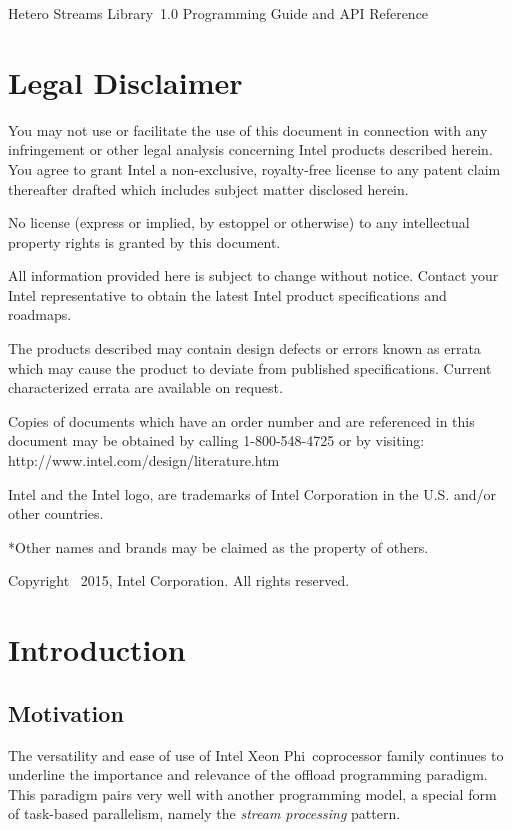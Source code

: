 \documentclass[a4,oneside]{book}
\newcommand{\ixp}{Intel\textregistered{} Xeon Phi\texttrademark{}}
\newcommand{\heterostreams}{Hetero Streams Library}
\begin{document}
\hypersetup{pageanchor=false}
\begin{titlepage}
\vspace*{7cm}
\begin{center}
    {\Large \heterostreams\ 1.0 Programming Guide and API Reference}\\[2em]
\end{center}
\end{titlepage}
\clearemptydoublepage
\chapter*{Legal Disclaimer}
You may not use or facilitate the use of this document in connection with any infringement or other legal analysis concerning Intel products described herein. You agree to grant Intel a non-exclusive, royalty-free license to any patent claim thereafter drafted which includes subject matter disclosed herein.

No license (express or implied, by estoppel or otherwise) to any intellectual property rights is granted by this document.

All information provided here is subject to change without notice. Contact your Intel representative to obtain the latest Intel product specifications and roadmaps.

The products described may contain design defects or errors known as errata which may cause the product to deviate from published specifications. Current characterized errata are available on request.

Copies of documents which have an order number and are referenced in this document may be obtained by calling 1-800-548-4725 or by visiting: http://www.intel.com/design/literature.htm

Intel and the Intel logo, are trademarks of Intel Corporation in the U.S. and/or other countries.

*Other names and brands may be claimed as the property of others.

Copyright \textcopyright\ 2015, Intel Corporation. All rights reserved.
\clearemptydoublepage

\tableofcontents
\clearemptydoublepage
{}
\hypersetup{pageanchor=true}

\chapter{Introduction}
\section{Motivation}
The versatility and ease of use of \ixp\ coprocessor family continues to underline the importance and relevance of the offload programming paradigm.
This paradigm pairs very well with another programming model, a special form of task-based parallelism, namely the \emph{stream processing} pattern.
\end{document}

